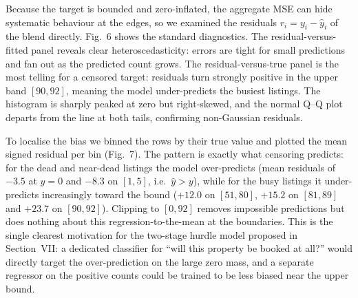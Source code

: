 \documentclass[11pt]{article}
\begin{document}
Because the target is bounded and zero-inflated, the aggregate MSE can hide systematic behaviour at the edges, so we examined the residuals $r_i=y_i-\hat y_i$ of the blend directly. Fig.~6 shows the standard diagnostics. The residual-versus-fitted panel reveals clear heteroscedasticity: errors are tight for small predictions and fan out as the predicted count grows. The residual-versus-true panel is the most telling for a censored target: residuals turn strongly positive in the upper band $[90,92]$, meaning the model under-predicts the busiest listings. The histogram is sharply peaked at zero but right-skewed, and the normal Q--Q plot departs from the line at both tails, confirming non-Gaussian residuals.
\par\medskip
To localise the bias we binned the rows by their true value and plotted the mean signed residual per bin (Fig.~7). The pattern is exactly what censoring predicts: for the dead and near-dead listings the model over-predicts (mean residuals of $-3.5$ at $y=0$ and $-8.3$ on $[1,5]$, i.e.\ $\hat y>y$), while for the busy listings it under-predicts increasingly toward the bound ($+12.0$ on $[51,80]$, $+15.2$ on $[81,89]$ and $+23.7$ on $[90,92]$). Clipping to $[0,92]$ removes impossible predictions but does nothing about this regression-to-the-mean at the boundaries. This is the single clearest motivation for the two-stage hurdle model proposed in Section~VII: a dedicated classifier for ``will this property be booked at all?'' would directly target the over-prediction on the large zero mass, and a separate regressor on the positive counts could be trained to be less biased near the upper bound.
\end{document}
